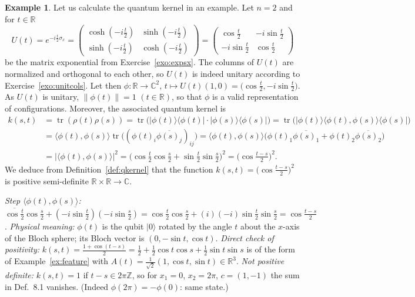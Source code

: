 \documentclass[11pt,a4paper]{article}
\numberwithin{equation}{section}
\newcommand{\Z}{\mathbb{Z}}
\newcommand{\R}{\mathbb{R}}
\newcommand{\C}{\mathbb{C}}
\newcommand{\ip}[2]{\langle #1, #2\rangle}
\newcommand{\ket}[1]{|#1\rangle}
\newcommand{\bra}[1]{\langle #1|}
\newcommand{\ketbra}[2]{|#1\rangle\langle #2|}
\newcommand{\conj}[1]{\overline{#1}}
\DeclareMathOperator{\tr}{tr}
\theoremstyle{plain}
\theoremstyle{definition}
\newtheorem{example}[theorem]{Example}
\theoremstyle{plain}
\theoremstyle{definition}
\begin{document}
\begin{example}\label{ex:qkernel}
Let us calculate the quantum kernel in an example. Let $n=2$ and for $t\in\R$
\[
U(t)=e^{-i\frac t2\sigma_x}=\begin{pmatrix}\cosh(-i\frac t2)&\sinh(-i\frac t2)\\\sinh(-i\frac t2)&\cosh(-i\frac t2)\end{pmatrix}
=\begin{pmatrix}\cos\frac t2&-i\sin\frac t2\\-i\sin\frac t2&\cos\frac t2\end{pmatrix}
\]
be the matrix exponential from Exercise~\ref{exo:expsx}. The columns of $U(t)$ are
normalized and orthogonal to each other, so $U(t)$ is indeed unitary according to
Exercise~\ref{exo:unitcols}. Let then $\phi:\R\to\C^2$,
$t\mapsto U(t)(1,0)=\big(\cos\frac t2,-i\sin\frac t2\big)$. As $U(t)$ is unitary,
$\|\phi(t)\|=1$ $(t\in\R)$, so that $\phi$ is a valid representation of configurations.
Moreover, the associated quantum kernel is
\begin{align*}
k(s,t)&=\tr(\rho(t)\rho(s))=\tr\big(\ketbra{\phi(t)}{\phi(t)}\cdot\ketbra{\phi(s)}{\phi(s)}\big)
=\tr\big(\ket{\phi(t)}\ip{\phi(t)}{\phi(s)}\bra{\phi(s)}\big)\\
&=\ip{\phi(t)}{\phi(s)}\tr\big((\phi(t)_i\conj{\phi(s)_j})_{ij}\big)
=\ip{\phi(t)}{\phi(s)}\big(\phi(t)_1\conj{\phi(s)_1}+\phi(t)_2\conj{\phi(s)_2}\big)\\
&=|\ip{\phi(t)}{\phi(s)}|^2=\Big(\cos\frac t2\cos\frac s2+\sin\frac t2\sin\frac s2\Big)^2
=\Big(\cos\frac{t-s}2\Big)^2 .
\end{align*}
We deduce from Definition~\ref{def:qkernel} that the function
$k(s,t)=\big(\cos\frac{t-s}2\big)^2$ is positive semi-definite $\R\times\R\to\C$.
\end{example}

\begin{addition}
\emph{Step $\ip{\phi(t)}{\phi(s)}$:}
$\conj{\cos\frac t2}\cos\frac s2+\conj{(-i\sin\frac t2)}(-i\sin\frac s2)
=\cos\frac t2\cos\frac s2+(i)(-i)\sin\frac t2\sin\frac s2=\cos\frac{t-s}2$.
\emph{Physical meaning:} $\phi(t)$ is the qubit $\ket0$ rotated by the angle $t$ about the
$x$-axis of the Bloch sphere; its Bloch vector is $(0,-\sin t,\cos t)$.
\emph{Direct check of positivity:} $k(s,t)=\frac{1+\cos(t-s)}2
=\frac12+\frac12\cos t\cos s+\frac12\sin t\sin s$ is of the form of Example~\ref{ex:feature}
with $A(t)=\frac1{\sqrt2}(1,\cos t,\sin t)\in\R^3$.
\emph{Not positive definite:} $k(s,t)=1$ if $t-s\in2\pi\Z$, so for $x_1=0$, $x_2=2\pi$,
$c=(1,-1)$ the sum in Def.~8.1 vanishes. (Indeed $\phi(2\pi)=-\phi(0)$: same state.)
\end{addition}
\end{document}
